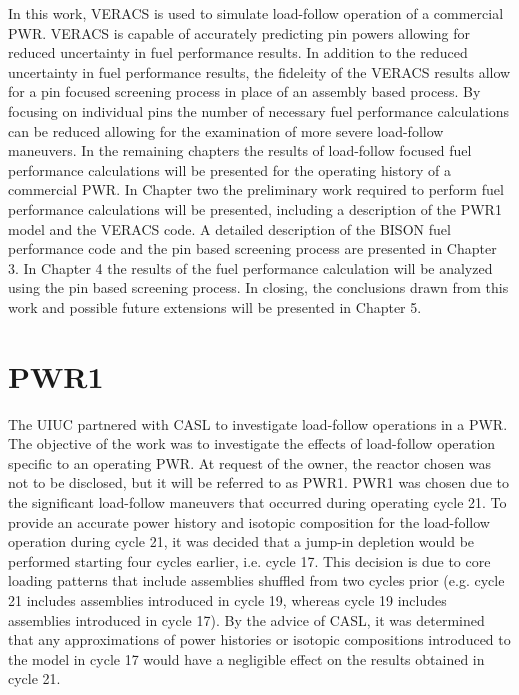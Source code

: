 \documentclass[edeposit,fullpage,11pt]{uiucthesis2009}
\begin{document}
In this work, \gls{VERACS} is used to simulate load-follow operation of a commercial \gls{PWR}.
\gls{VERACS} is capable of accurately predicting pin powers allowing for reduced uncertainty in fuel performance results.
In addition to the reduced uncertainty in fuel performance results, the fideleity of the \gls{VERACS} results allow for a pin focused screening process in place of an assembly based process.
By focusing on individual pins the number of necessary fuel performance calculations can be reduced allowing for the examination of more severe load-follow maneuvers.
In the remaining chapters the results of load-follow focused fuel performance calculations will be presented for the operating history of a commercial \gls{PWR}.
In Chapter two the preliminary work required to perform fuel performance calculations will be presented, including a description of the PWR1 model and the \gls{VERACS} code. 
A detailed description of the BISON fuel performance code and the pin based screening process are presented in Chapter 3.
In Chapter 4 the results of the fuel performance calculation will be analyzed using the pin based screening process.
In closing, the conclusions drawn from this work and possible future extensions will be presented in Chapter 5.


\chapter{PWR1}
The \gls{UIUC} partnered with \gls{CASL} to investigate load-follow operations in a PWR. 
The objective of the work was to investigate the effects of load-follow operation specific to an operating PWR. 
At request of the owner, the reactor chosen was not to be disclosed, but it will be referred to as PWR1.
PWR1 was chosen due to the significant load-follow maneuvers that occurred during operating cycle 21. 
To provide an accurate power history and isotopic composition for the load-follow operation during cycle 21, it was decided that a jump-in depletion would be performed starting four cycles earlier, i.e. cycle 17. 
This decision is due to core loading patterns that include assemblies shuffled from two cycles prior (e.g. cycle 21 includes assemblies introduced in cycle 19, whereas cycle 19 includes assemblies introduced in cycle 17). 
By the advice of \gls{CASL}, it was determined that any approximations of power histories or isotopic compositions introduced to the model in cycle 17 would have a negligible effect on the results obtained in cycle 21.
\end{document}
